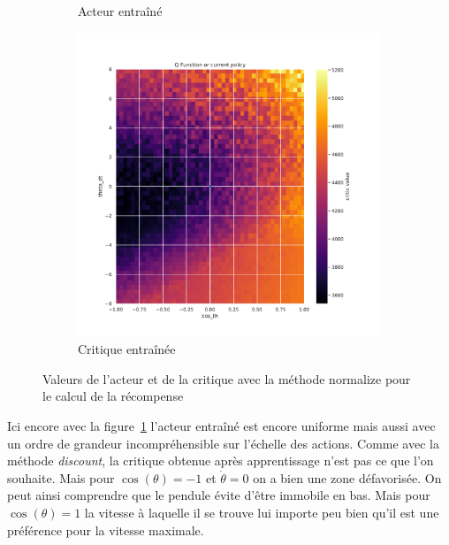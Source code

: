 \begin{figure}[H]
\begin{subfigure}{0.3\textwidth}
        \caption{Acteur entraîné}
    \end{subfigure}
    \begin{subfigure}{0.3\textwidth}
        \includegraphics[width=\textwidth]{figures/iteration2/0_critic_normalize_post_Pendulum-v0.pdf}
        \caption{Critique entraînée}
    \end{subfigure}
    \caption{Valeurs de l'acteur et de la critique avec la méthode normalize pour le calcul de la récompense}
    \label{fig:itr2_normalize}
\end{figure}

Ici encore avec la figure~\ref{fig:itr2_normalize} l'acteur entraîné est encore uniforme mais aussi avec un ordre de grandeur incompréhensible sur l'échelle des actions. Comme avec la méthode \emph{discount}, la critique obtenue après apprentissage n'est pas ce que l'on souhaite. Mais pour $\cos(\theta) = -1$ et $\dot{\theta} = 0$ on a bien une zone défavorisée. On peut ainsi comprendre que le pendule évite d'être immobile en bas. Mais pour $\cos(\theta) = 1$ la vitesse à laquelle il se trouve lui importe peu bien qu'il est une préférence pour la vitesse maximale.